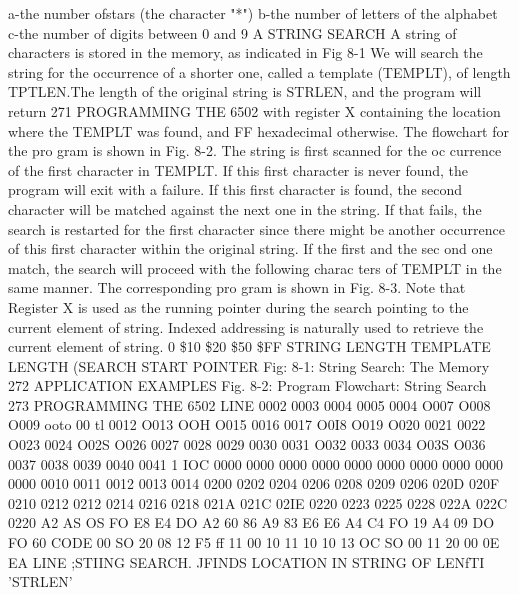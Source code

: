 \documentclass{book}
\begin{document}
a-the number ofstars (the character "*")
b-the number of letters of the alphabet
c-the number of digits between 0 and 9
A STRING SEARCH
A string of characters is stored in the memory, as indicated in
Fig 8-1 We will search the string for the occurrence of a shorter
one, called a template (TEMPLT), of length TPTLEN.The length
of the original string is STRLEN, and the program will return
271
PROGRAMMING THE 6502
with register X containing the location where the TEMPLT was
found, and FF hexadecimal otherwise. The flowchart for the pro
gram is shown in Fig. 8-2. The string is first scanned for the oc
currence of the first character in TEMPLT. If this first character
is never found, the program will exit with a failure. If this first
character is found, the second character will be matched against
the next one in the string. If that fails, the search is restarted for
the first character since there might be another occurrence of this
first character within the original string. If the first and the sec
ond one match, the search will proceed with the following charac
ters of TEMPLT in the same manner. The corresponding pro
gram is shown in Fig. 8-3. Note that Register X is used as the
running pointer during the search pointing to the current element
of string. Indexed addressing is naturally used to retrieve the
current element of string.
0
\$10
\$20
\$50
\$FF
STRING LENGTH
TEMPLATE LENGTH
(SEARCH START POINTER
Fig: 8-1: String Search: The Memory
272
APPLICATION EXAMPLES
Fig. 8-2: Program Flowchart: String Search
273
PROGRAMMING THE 6502
LINE
0002
0003
0004
0005
0004
O007
O008
O009
ooto
00 tl
0012
O013
OOH
O015
0016
0017
O0I8
O019
O020
0021
0022
O023
0024
O02S
O026
0027
0028
0029
0030
0031
O032
0033
0034
O03S
O036
0037
0038
0039
0040
0041
1 IOC
0000
0000
0000
0000
0000
0000
0000
0000
0000
0000
0010
0011
0012
0013
0014
0200
0202
0204
0206
0208
0209
0206
020D
020F
0210
0212
0212
0214
0216
0218
021A
021C
02IE
0220
0223
0225
0228
022A
022C
0220
A2
AS
OS
FO
E8
E4
DO
A2
60
86
A9
83
E6
E6
A4
C4
FO
19
A4
09
DO
FO
60
CODE
00
SO
20
08
12
F5
ff
11
00
10
11
10
10
13
OC
SO 00
11
20 00
0E
EA
LINE
;STIING SEARCH.
JFINDS LOCATION IN STRING OF LENfTI 'STRLEN'
\end{document}
